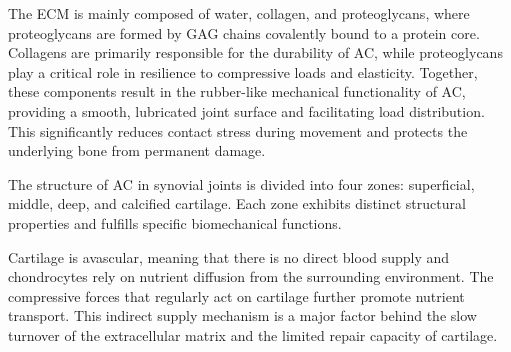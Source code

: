 The ECM is mainly composed of water, collagen, and proteoglycans, where proteoglycans are formed by GAG chains covalently bound to a protein core. Collagens are primarily responsible for the durability of AC, while proteoglycans play a critical role in resilience to compressive loads and elasticity.\cite{Kjellen1991,Akizuki1986} Together, these components result in the rubber-like mechanical functionality of AC, providing a smooth, lubricated joint surface and facilitating load distribution. This significantly reduces contact stress during movement and protects the underlying bone from permanent damage.

The structure of AC in synovial joints is divided into four zones: superficial, middle, deep, and calcified cartilage. Each zone exhibits distinct structural properties and fulfills specific biomechanical functions.\cite{Yoo2024,SophiaFox2009}

Cartilage is avascular, meaning that there is no direct blood supply and chondrocytes rely on nutrient diffusion from the surrounding environment. The compressive forces that regularly act on cartilage further promote nutrient transport. This indirect supply mechanism is a major factor behind the slow turnover of the extracellular matrix and the limited repair capacity of cartilage.\cite{Oliveira2017}
